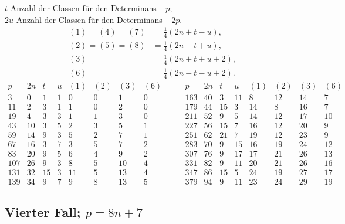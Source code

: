 \documentclass[12pt]{article}
\begin{document}
$t$ Anzahl der Classen für den Determinans $-p$;\\
$2u$ Anzahl der Classen für den Determinans $-2p$.
\[
\begin{aligned}
(1)=(4)=(7)&=\frac14(2n+t-u),\\
(2)=(5)=(8)&=\frac14(2n-t+u),\\
(3)&=\frac14(2n+t+u+2),\\
(6)&=\frac14(2n-t-u+2).
\end{aligned}
\]
{\scriptsize
\[
\begin{array}{r|r|r|r|r|r|r|r}
p&2n&t&u&(1)&(2)&(3)&(6)\\\hline
3&0&1&1&0&0&1&0\\
11&2&3&1&1&0&2&0\\
19&4&3&3&1&1&3&0\\
43&10&3&5&2&3&5&1\\
59&14&9&3&5&2&7&1\\
67&16&3&7&3&5&7&2\\
83&20&9&5&6&4&9&2\\
107&26&9&3&8&5&10&4\\
131&32&15&3&11&5&13&4\\
139&34&9&7&9&8&13&5
\end{array}
\qquad
\begin{array}{r|r|r|r|r|r|r|r}
p&2n&t&u&(1)&(2)&(3)&(6)\\\hline
163&40&3&11&8&12&14&7\\
179&44&15&3&14&8&16&7\\
211&52&9&5&14&12&17&10\\
227&56&15&7&16&12&20&9\\
251&62&21&7&19&12&23&9\\
283&70&9&15&16&19&24&12\\
307&76&9&17&17&21&26&13\\
331&82&9&11&20&21&26&16\\
347&86&15&5&24&19&27&17\\
379&94&9&11&23&24&29&19
\end{array}
\]
}

\subsection*{Vierter Fall; \(p=8n+7\)}
\end{document}
